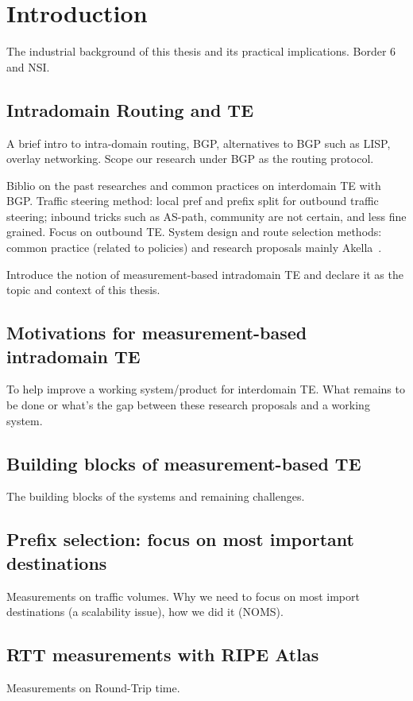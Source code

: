 \chapter{Introduction}
\label{sec:intro}

The industrial background of this thesis and its practical implications.
Border 6 and NSI.

\section{Intradomain Routing and TE}
A brief intro to intra-domain routing, BGP, alternatives to BGP such as LISP, overlay networking.
Scope our research under BGP as the routing protocol.

Biblio on the past researches and common practices on interdomain TE with BGP.
Traffic steering method: local pref and prefix split for outbound traffic steering; inbound tricks such as AS-path, community are not certain, and less fine grained. Focus on outbound TE.
System design and route selection methods: common practice (related to policies) and research proposals mainly Akella~\cite{Akella2008}.

Introduce the notion of measurement-based intradomain TE and declare it as the topic and context of this thesis.

\section{Motivations for measurement-based intradomain TE}
To help improve a working system/product for interdomain TE.
What remains to be done or what's the gap between these research proposals and a working system.

\section{Building blocks of measurement-based TE}
The building blocks of the systems and remaining challenges.

\section{Prefix selection: focus on most important destinations}
Measurements on traffic volumes.
Why we need to focus on most import destinations (a scalability issue), how we did it (NOMS).

\section{RTT measurements with RIPE Atlas}
Measurements on Round-Trip time.
